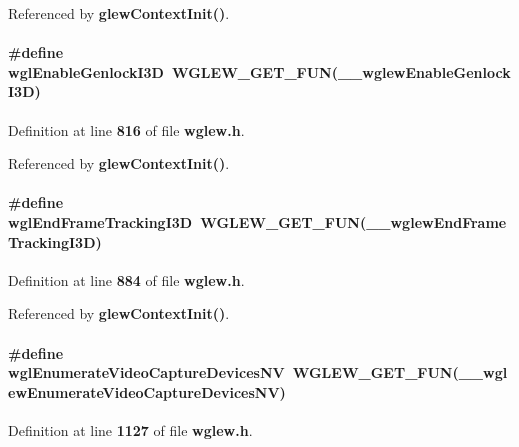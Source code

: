 Referenced by {\bf glew\+Context\+Init()}.

\paragraph[{wgl\+Enable\+Genlock\+I3D}]{\setlength{\rightskip}{0pt plus 5cm}\#define wgl\+Enable\+Genlock\+I3D~{\bf W\+G\+L\+E\+W\+\_\+\+G\+E\+T\+\_\+\+F\+UN}({\bf \+\_\+\+\_\+wglew\+Enable\+Genlock\+I3D})}\label{wglew_8h_ac3a965f10b1119f34ab811c2913255ae}


Definition at line {\bf 816} of file {\bf wglew.\+h}.



Referenced by {\bf glew\+Context\+Init()}.

\paragraph[{wgl\+End\+Frame\+Tracking\+I3D}]{\setlength{\rightskip}{0pt plus 5cm}\#define wgl\+End\+Frame\+Tracking\+I3D~{\bf W\+G\+L\+E\+W\+\_\+\+G\+E\+T\+\_\+\+F\+UN}({\bf \+\_\+\+\_\+wglew\+End\+Frame\+Tracking\+I3D})}\label{wglew_8h_aa40000aab494d3a824b6a50f7c832591}


Definition at line {\bf 884} of file {\bf wglew.\+h}.



Referenced by {\bf glew\+Context\+Init()}.

\paragraph[{wgl\+Enumerate\+Video\+Capture\+Devices\+NV}]{\setlength{\rightskip}{0pt plus 5cm}\#define wgl\+Enumerate\+Video\+Capture\+Devices\+NV~{\bf W\+G\+L\+E\+W\+\_\+\+G\+E\+T\+\_\+\+F\+UN}({\bf \+\_\+\+\_\+wglew\+Enumerate\+Video\+Capture\+Devices\+NV})}\label{wglew_8h_acec1d2ce4e57d8997af9fcfb87518841}


Definition at line {\bf 1127} of file {\bf wglew.\+h}.



